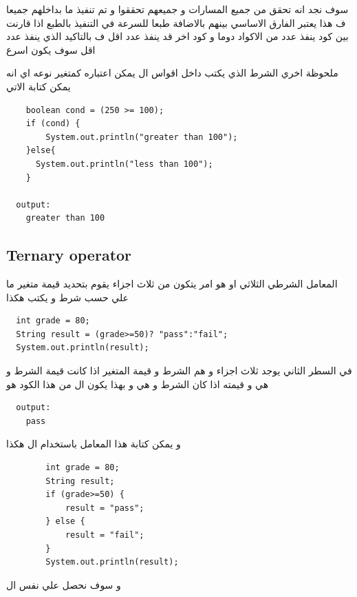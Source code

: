  \begin{AR}
    سوف نجد انه تحقق من جميع المسارات و جميعهم تحققوا و تم تنفيذ ما بداخلهم جميعا 
    \\
    ف هذا يعتبر الفارق الاساسي بينهم بالاضافة طبعا للسرعة في التنفيذ بالطبع اذا قارنت بين كود ينفذ عدد من الاكواد دوما و كود اخر قد ينفذ عدد اقل ف بالتاكيد الذي ينفذ عدد اقل سوف يكون اسرع
    \par
    ملحوظة اخري الشرط الذي يكتب داخل اقواس ال  يمكن اعتباره كمتغير نوعه  اي انه يمكن كتابة الاتي 
  \end{AR}
  \begin{verbatim}
    boolean cond = (250 >= 100);
    if (cond) {
        System.out.println("greater than 100");
    }else{
      System.out.println("less than 100");
    }

  output: 
    greater than 100
\end{verbatim}
  
\subsection{Ternary operator}
\begin{AR}
  المعامل الشرطي الثلاثي او  هو امر يتكون من ثلاث اجزاء يقوم بتحديد قيمة متغير ما علي حسب
  شرط و يكتب هكذا 
\end{AR}

\begin{verbatim}
  int grade = 80;
  String result = (grade>=50)? "pass":"fail";
  System.out.println(result);
\end{verbatim}
\begin{AR}
  في السطر الثاني يوجد ثلاث اجزاء و هم الشرط  و قيمة المتغير  اذا كانت قيمة الشرط  و هي  و قيمته اذا كان الشرط  و هي 
  و بهذا يكون ال  من هذا الكود هو 
\end{AR}
\begin{verbatim}
  output: 
    pass
\end{verbatim}
\begin{AR}
  و يمكن كتابة هذا المعامل باستخدام ال  هكذا
\end{AR}
\begin{verbatim}
        int grade = 80;
        String result;
        if (grade>=50) {
            result = "pass";
        } else {
            result = "fail";
        }
        System.out.println(result);
\end{verbatim}
\begin{AR}
  و سوف نحصل علي نفس ال 
\end{AR}
\newpage
